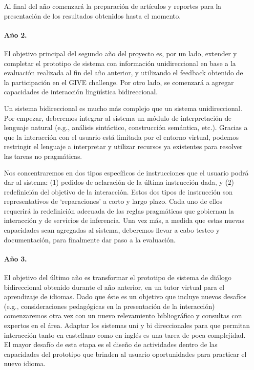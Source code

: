 \documentclass[11pt]{article}
\begin{document}
Al final del a\~no comenzar\'a la preparaci\'on de art\'iculos y reportes para
la presentaci\'on de los resultados obtenidos hasta el momento.

\paragraph{A\~no 2.} El objetivo principal del segundo a\~no del proyecto es,
por un lado, extender y completar el prototipo de sistema con informaci\'on
unidireccional en base a la evaluaci\'on realizada al fin del a\~no anterior,
y utilizando el feedback obtenido de la
participaci\'on en el GIVE challenge.  Por otro lado, se comenzar\'a a agregar
capacidades de interacci\'on ling\"u\'istica bidireccional.

Un sistema
bidireccional es mucho m\'as complejo que un sistema unidireccional.  Por
empezar, deberemos integrar al sistema un m\'odulo de interpretaci\'on de
lenguaje natural (e.g., an\'alisis sint\'actico, construcci\'on sem\'antica,
etc.).
Gracias a que la interacci\'on con el usuario est\'a limitada por el entorno
virtual, podemos restringir el lenguaje a interpretar y utilizar recursos ya 
existentes para resolver las tareas no pragm\'aticas.

Nos concentraremos en dos tipos espec\'ificos de instrucciones que el usuario
podr\'a dar al sistema: (1) pedidos de aclaraci\'on de la \'ultima
instrucci\'on dada, y (2) redefinici\'on del objetivo de la interacci\'on. 
Estos
dos tipos de instrucci\'on son representativos de `reparaciones' a corto y
largo plazo.  Cada uno de ellos requerir\'a la redefinici\'on adecuada de
las reglas pragm\'aticas que gobiernan la interacci\'on y de servicios
de inferencia.  Una vez m\'as, a medida que
estas nuevas capacidades sean agregadas al sistema, deberemos llevar a
cabo testeo y documentaci\'on, para finalmente dar paso a la evaluaci\'on.



\paragraph{A\~no 3.} El objetivo del \'ultimo a\~no es transformar el prototipo
de sistema de di\'alogo bidireccional obtenido durante el a\~no anterior, en un
tutor virtual para el aprendizaje de idiomas.  Dado que
\'este es un objetivo que incluye nuevos desaf\'ios (e.g., consideraciones
pedag\'ogicas en la presentaci\'on de la interacci\'on) comenzaremos otra
vez con un nuevo relevamiento bibliogr\'afico y consultas con expertos en
el \'area.  Adaptar los sistemas uni y bi direccionales para que permitan
interacci\'on tanto en castellano como en ingl\'es es una tarea de poca
complejidad.  El mayor desaf\'io de esta etapa es el dise\~no de
actividades dentro de las capacidades del prototipo que brinden al
usuario oportunidades para practicar el nuevo idioma.
\end{document}
